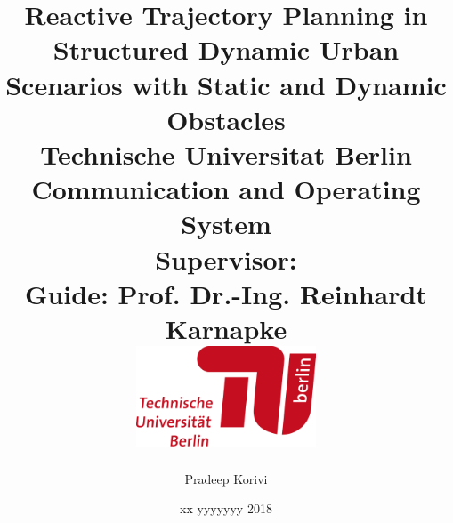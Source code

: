 \newtheorem{exmp}{Example}[section]
\graphicspath{ {images/} }
\pagestyle{fancy}
\fancyhead{}
\fancyfoot{}
\fancyfoot[LE,RO]{\thepage}

\title{
    \textbf{Reactive Trajectory Planning in Structured Dynamic Urban Scenarios with Static and Dynamic Obstacles}\\
    \vspace{0.5cm}
     \textbf{\large Technische Universitat Berlin}\\
    \vspace{0.1cm}
    \textbf{\large Communication and Operating System}\\
    \large {Supervisor: }\\
    \vspace{0.1cm}
    \vspace{0.1cm}
    \large {Guide: Prof. Dr.-Ing. Reinhardt Karnapke}\\
    \vspace{0.1cm}
    \vspace{0.1cm}
    \vspace{2cm}
    {\includegraphics[width=0.4\textwidth]{images/university.png}}
    \vspace{0.5cm}
}
\author{Pradeep Korivi}
\date{xx yyyyyyy 2018}


\newlength\figureheight 
\newlength\figurewidth 
\setlength{}
\setlength{}

